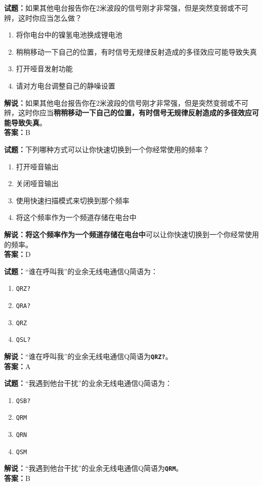 \documentclass{ctexbook}
\begin{document}
\bigskip


\noindent\textbf{试题：}如果其他电台报告你在2米波段的信号刚才非常强，但是突然变弱或不可辨，这时你应当怎么做？
\begin{enumerate}[leftmargin=3em]
	\item 将你电台中的镍氢电池换成锂电池
	\item 稍稍移动一下自己的位置，有时信号无规律反射造成的多径效应可能导致失真
	\item 打开哑音发射功能
	\item 请对方电台调整自己的静噪设置
\end{enumerate}
\noindent\textbf{解说：}如果其他电台报告你在2米波段的信号刚才非常强，但是突然变弱或不可辨，这时你应当\textbf{稍稍移动一下自己的位置，有时信号无规律反射造成的多径效应可能导致失真}。\\\noindent\textbf{答案：}B


\bigskip


\noindent\textbf{试题：}下列哪种方式可以让你快速切换到一个你经常使用的频率？
\begin{enumerate}[leftmargin=3em]
	\item 打开哑音输出
	\item 关闭哑音输出
	\item 使用快速扫描模式来切换到那个频率
	\item 将这个频率作为一个频道存储在电台中
\end{enumerate}
\noindent\textbf{解说：}\textbf{将这个频率作为一个频道存储在电台中}可以让你快速切换到一个你经常使用的频率。\\\noindent\textbf{答案：}D


\bigskip


\noindent\textbf{试题：}“谁在呼叫我”的业余无线电通信Q简语为：

\begin{enumerate}[leftmargin=3em]
	\item \texttt{QRZ?}
	\item \texttt{QRA?}
	\item \texttt{QRZ}
	\item \texttt{QSL?}
\end{enumerate}

\noindent\textbf{解说：}“谁在呼叫我”的业余无线电通信Q简语为\texttt{\textbf{QRZ?}}。\\\noindent\textbf{答案：}A


\bigskip


\noindent\textbf{试题：}“我遇到他台干扰”的业余无线电通信Q简语为：

\begin{enumerate}[leftmargin=3em]
	\item \texttt{QSB?}
	\item \texttt{QRM}
	\item \texttt{QRN}
	\item \texttt{QSM}
\end{enumerate}
\noindent\textbf{解说：}“我遇到他台干扰”的业余无线电通信Q简语为\texttt{\textbf{QRM}}。\\\noindent\textbf{答案：}B
\end{document}
